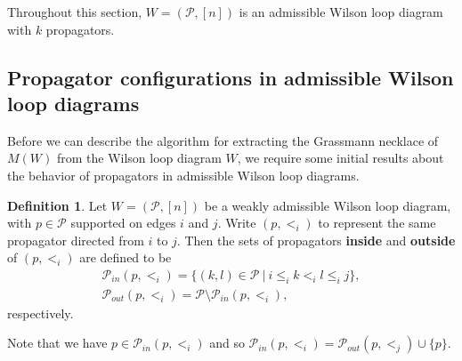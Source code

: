\documentclass[11pt]{article}
\newcommand{\note}{\todo[color=green!40]}
\newcommand{\cP}{\mathcal{P}}
\theoremstyle{remark}
\theoremstyle{definition}
\newtheorem{dfn}[thm]{Definition}
\begin{document}


Throughout this section, $W = (\cP,[n])$ is an admissible Wilson loop diagram with $k$ propagators.





\subsection{Propagator configurations in admissible Wilson loop diagrams}\label{sec:propagator configs}

Before we can describe the algorithm for extracting the Grassmann necklace of $M(W)$ from the Wilson loop diagram $W$, we require some initial results about the behavior of propagators in admissible Wilson loop diagrams.



\begin{dfn}\label{props inside p}
Let $W = (\cP, [n])$ be a weakly admissible Wilson loop diagram, with $p \in \cP$ supported on edges $i$ and $j$. Write $(p, <_i)$ to represent the same propagator directed from $i$ to $j$. Then the sets of propagators {\bf inside} and {\bf outside} of $(p,<_i)$ are defined to be
\begin{gather*}\cP_{in}(p,<_i) = \{ (k,l) \in \cP \ |\ i \leq_i k <_i l \leq_i j \}, \\
\cP_{out}(p,<_i) = \cP\setminus \cP_{in}(p,<_i),
\end{gather*}
respectively.
\end{dfn}
Note that we have $p\in \cP_{in}(p, <_i)$ and so $\cP_{in}(p, <_i) = \cP_{out}(p, <_j)\cup\{p\}$.
\end{document}
